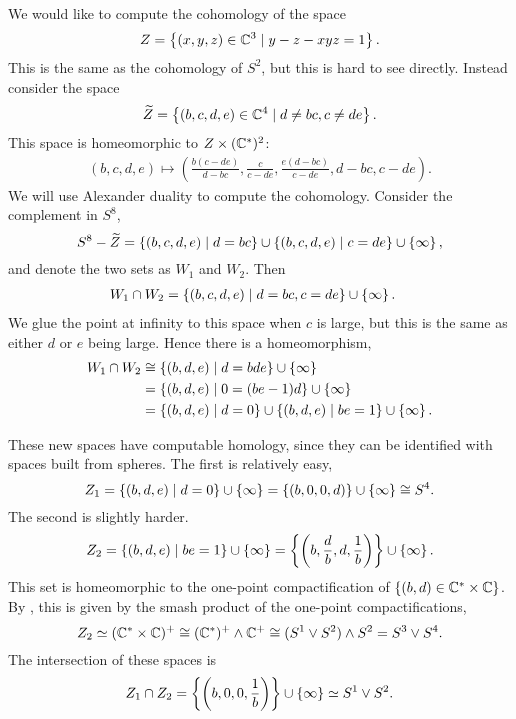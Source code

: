 \begin{example}
  We would like to compute the cohomology of the space 
  \[ Z = \left\{  (x,y,z)\in\mathbb{C}^3 \mid y-z -xyz = 1 \right\}. \]
  This is the same as the cohomology of $S^2$, but this is hard to see
  directly. Instead consider the space
  \[ \widetilde Z = \left\{ (b,c,d,e) \in \mathbb{C}^4 \mid d\neq
    bc, c\neq de \right\}. \]
  This space is homeomorphic to $Z\times (\mathbb{C}^*)^2$:
  \begin{align*}
    (b,c,d,e) \mapsto \left(
    \frac{b(c-de)}{d-bc}, \frac{c}{c-de}, \frac{e(d-bc)}{c-de},
    d-bc, c-de\right).
  \end{align*}
  We will use Alexander duality to compute the cohomology. Consider
  the complement in $S^8$,
  \[ S^8-\widetilde Z = \left\{ (b,c,d,e) \mid d = bc \right\} \cup \left\{ (b,c,d,e)
    \mid c = de \right\} \cup \left\{ \infty \right\}, \]
  and denote the two sets as $W_1$ and $W_2$. Then
  \begin{align*}
    W_1\cap W_2 &= \left\{ (b,c,d,e) \mid d=bc,c=de \right\}\cup\left\{ \infty \right\}.
  \end{align*}
  We glue the point at infinity to this space when $c$ is large, but
  this is the same as either $d$ or $e$ being large. Hence there is a
  homeomorphism,
  \begin{align*}
    W_1\cap W_2 &\cong \left\{ (b,d,e) \mid d=bde \right\}\cup\left\{ \infty \right\} \\
                &= \left\{ (b,d,e)\mid 0 = (be-1)d \right\}\cup\left\{ \infty \right\} \\
                &= \left\{ (b,d,e) \mid d = 0 \right\} \cup \left\{ (b,d,e) \mid
                  be=1 \right\}\cup\left\{ \infty \right\}.
  \end{align*}
  
  These new spaces have computable homology, since they can be
  identified with spaces built from spheres. The first is relatively
  easy,
  \[ Z_1 = \left\{ (b,d,e)\mid d = 0 \right\}\cup \left\{ \infty \right\} =
  \left\{ (b,0,0,d) \right\}\cup\left\{ \infty \right\} \cong S^4. \]
  The second is slightly harder.
  \[ Z_2 =\left\{ (b,d,e)\mid be=1 \right\}\cup\left\{ \infty \right\}=
  \left\{ \left(b,\frac{d}{b},d,\frac{1}{b} \right)  \right\}\cup\left\{ \infty \right\}. \]
  This set is homeomorphic to the one-point compactification of
  $\left\{ (b,d)\in \mathbb{C}^*\times \mathbb{C} \right\}$. By \cite[Chapter~2.3]{dupontk}, this
  is given by the smash product of the one-point compactifications,
  \[ Z_2\simeq (\mathbb{C}^*\times\mathbb{C})^+ \cong (\mathbb{C}^*)^+\wedge\mathbb{C}^+ \cong (S^1\vee
  S^2) \wedge S^2 = S^3 \vee S^4. \]
  The intersection of these spaces is
  \[ Z_1\cap Z_2 = \left\{ \left(b,0,0,\frac{1}{b}\right) \right\}\cup\left\{ \infty \right\}
  \simeq S^1\vee S^2. \]
  

\end{example}
